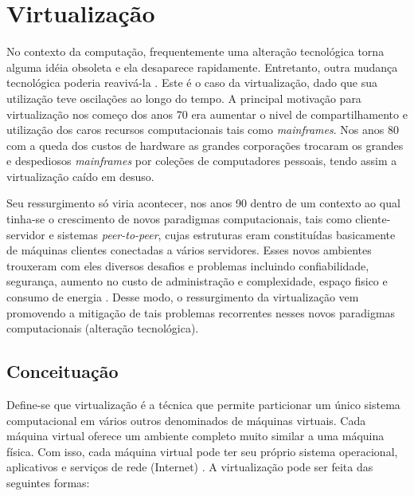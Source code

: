\chapter{Virtualização}
\label{cap:referencial_teorico}
No contexto da computação, frequentemente uma alteração tecnológica torna alguma idéia obsoleta e ela desaparece rapidamente. Entretanto, outra mudança tecnológica poderia reavivá-la \cite{tanembaum}. Este é o caso da virtualização, dado que sua utilização teve oscilações ao longo do tempo. A principal motivação para virtualização nos começo dos anos 70 era aumentar o nivel de compartilhamento e utilização dos caros recursos computacionais tais como \textit{mainframes}\cite{menasce}. Nos anos 80 com a queda dos custos de hardware as grandes corporações trocaram os grandes e despediosos \textit{mainframes} por coleções de computadores pessoais, tendo assim a virtualização caído em desuso.

 Seu ressurgimento só viria acontecer, nos anos 90 dentro de um contexto ao qual tinha-se o crescimento de novos paradigmas computacionais, tais como cliente-servidor  e sistemas \textit{peer-to-peer}, cujas estruturas eram constituídas basicamente de máquinas clientes conectadas a vários servidores. Esses novos ambientes trouxeram com eles diversos desafios e problemas incluindo confiabilidade, segurança, aumento no custo de administração e complexidade, espaço fisico e consumo de energia \cite{menasce}. Desse modo, o ressurgimento da virtualização vem promovendo a mitigação de tais problemas recorrentes nesses novos paradigmas computacionais (alteração tecnológica).
 
\section{Conceituação} 
Define-se que virtualização é a técnica que permite particionar um único sistema computacional em vários outros denominados de máquinas virtuais. Cada máquina virtual oferece um ambiente completo muito similar a uma máquina física. Com isso, cada máquina virtual pode ter seu próprio sistema operacional, aplicativos e serviços de rede (Internet) \cite{carissimi}. A virtualização pode ser feita das seguintes formas:

